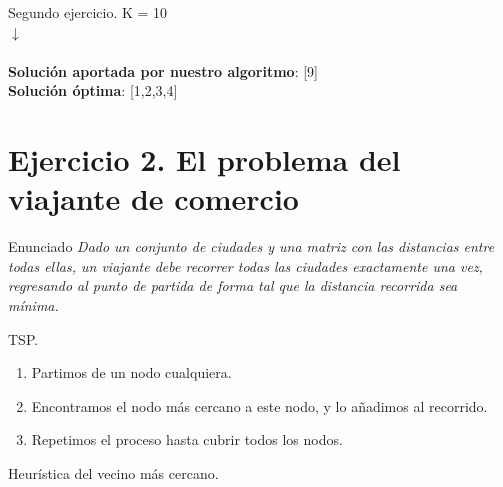 \documentclass[10pt, xcolor=table]{beamer}
\begin{document}
\begin{frame}[fragile]{Segundo ejercicio. }
	\centering [5, 4, 6, 1, 1, 2, 7, 9, 8, 3] \hspace{0.2cm}K = 10
	\\
	\centering $\downarrow$
	\\
	\centering [9, 8, 7, 6, 5, 4, 3, 2, 1, 1]
	\\
	\textbf{Solución aportada por nuestro algoritmo}: [9]
	\\
	\textbf{Solución óptima}: [1,2,3,4]
	
\end{frame}

\section{Ejercicio 2. El problema del viajante de comercio}

\begin{frame}[fragile]{Enunciado}
\textit{Dado un conjunto de ciudades y una matriz con las distancias entre todas ellas, un viajante debe recorrer todas las ciudades exactamente una vez, regresando al punto de partida de forma tal que la distancia recorrida sea mínima.}
\end{frame}

\begin{frame}[fragile]{TSP. }
\begin{enumerate}
	\item Partimos de un nodo cualquiera.
	\item Encontramos el nodo más cercano a este nodo, y lo añadimos al recorrido.
	\item Repetimos el proceso hasta cubrir todos los nodos.
\end{enumerate}
\end{frame}

\begin{frame}[fragile]{Heurística del vecino más cercano. }
\begin{center}
\scalebox{0.75}{

}
\end{center}
\end{frame}
\end{document}
